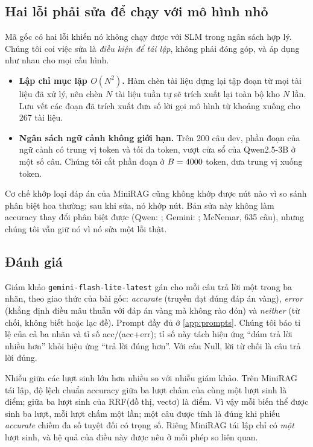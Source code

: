 \subsection{Hai lỗi phải sửa để chạy với mô hình nhỏ}\label{sec:fixes}
Mã gốc có hai lỗi khiến nó không chạy được với SLM trong ngân sách hợp lý.
Chúng tôi coi việc sửa là \emph{điều kiện để tái lập}, không phải đóng góp, và áp dụng như nhau cho mọi cấu hình.
\begin{itemize}
  \item \textbf{Lập chỉ mục lặp $O(N^2)$.} Hàm chèn tài liệu dựng lại tập đoạn từ mọi tài liệu đã xử lý, nên chèn $N$ tài liệu tuần tự sẽ trích xuất lại toàn bộ kho $N$ lần.
  Lưu vết các đoạn đã trích xuất đưa số lời gọi mô hình từ khoảng \callsBefore{} xuống \callsAfter{} cho 267 tài liệu.
  \item \textbf{Ngân sách ngữ cảnh không giới hạn.} Trên 200 câu dev, phần đoạn của ngữ cảnh có trung vị \ctxNoCapMed{} token và tối đa \ctxNoCapMax{} token, vượt cửa sổ của Qwen2.5-3B ở một số câu.
  Chúng tôi cắt phần đoạn ở $B = 4000$ token, đưa trung vị xuống \ctxCapMed{} token.
\end{itemize}
Cơ chế khớp loại đáp án của MiniRAG cũng không khớp được nút nào vì so sánh phân biệt hoa thường; sau khi sửa, nó khớp \atypeNodesFixed{} nút.
Bản sửa này không làm accuracy thay đổi phân biệt được (Qwen: \atypeQwen{}; Gemini: \atypeGemini{}; McNemar, 635 câu), nhưng chúng tôi vẫn giữ nó vì nó sửa một lỗi thật.

\subsection{Đánh giá}\label{sec:eval}
Giám khảo \texttt{gemini-flash-lite-latest} gán cho mỗi câu trả lời một trong ba nhãn, theo giao thức của bài gốc: \emph{accurate} (truyền đạt đúng đáp án vàng), \emph{error} (khẳng định điều mâu thuẫn với đáp án vàng mà không rào đón) và \emph{neither} (từ chối, không biết hoặc lạc đề).
Prompt đầy đủ ở \cref{app:prompts}.
Chúng tôi báo tỉ lệ của cả ba nhãn và tỉ số acc/(acc+err); tỉ số này tách hiệu ứng ``dám trả lời nhiều hơn'' khỏi hiệu ứng ``trả lời đúng hơn''.
Với câu Null, lời từ chối là câu trả lời đúng.

Nhiễu giữa các lượt sinh lớn hơn nhiều so với nhiễu giám khảo.
Trên MiniRAG tái lập, độ lệch chuẩn accuracy giữa ba lượt chấm của cùng một lượt sinh là \sdJudgeBase{} điểm; giữa ba lượt sinh của RRF(đồ thị, vectơ) là \sdGenGV{} điểm.
Vì vậy mỗi biến thể được sinh ba lượt, mỗi lượt chấm một lần; một câu được tính là đúng khi phiếu \emph{accurate} chiếm đa số tuyệt đối có trọng số.
Riêng MiniRAG tái lập chỉ có \emph{một} lượt sinh, và hệ quả của điều này được nêu ở mỗi phép so liên quan.
